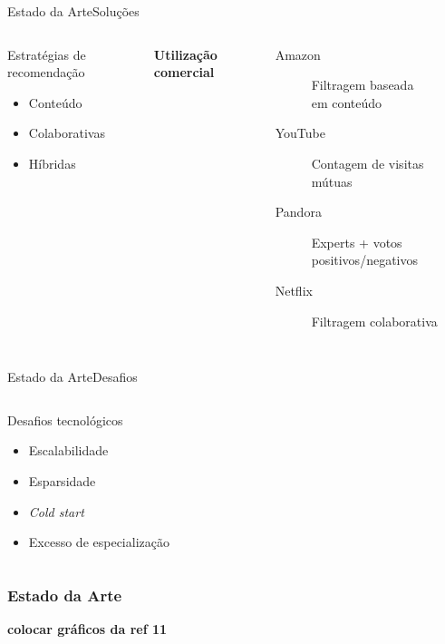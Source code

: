 \begin{frame}{Estado da Arte}{Soluções}
\begin{columns}[c]
\begin{block}{Estratégias de recomendação}
\begin{itemize}
	\item Conteúdo
	\item Colaborativas
	\item Híbridas
\end{itemize}
\end{block}





\textbf{Utilização comercial} \\ \cite{chiang2012networked}

\begin{description}
\item[Amazon] Filtragem baseada \\ em conteúdo
\item[YouTube] Contagem de visitas mútuas
\item[Pandora] Experts + votos positivos/negativos
\item[Netflix] Filtragem colaborativa
\end{description}
\end{columns}
\end{frame}


\begin{frame}{Estado da Arte}{Desafios}
\begin{columns}[c]

\begin{block}{Desafios tecnológicos}
\begin{itemize}
	\item Escalabilidade
	\item Esparsidade
	\item \textit{Cold start}
	\item Excesso de especialização
\end{itemize}
\end{block}

\end{columns}
\end{frame}


\begin{frame}
\frametitle{Estado da Arte}

\textbf{colocar gráficos da ref 11}
\end{frame}


